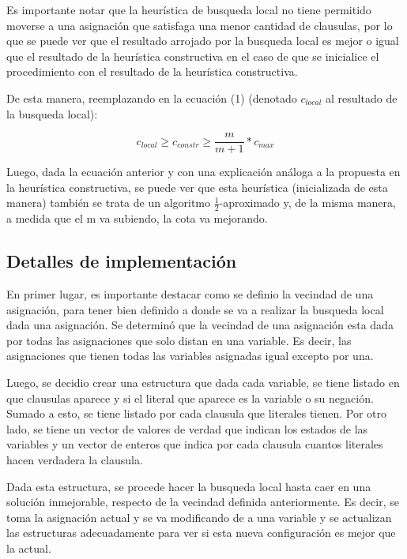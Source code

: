 \documentclass[a4paper,10pt]{article}
\begin{document}
Es importante notar que la heur\'istica de busqueda local no tiene permitido moverse a una asignaci\'on que satisfaga una menor cantidad de clausulas, por lo que se puede ver que el resultado arrojado por la busqueda local es mejor o igual que el resultado de la heur\'istica constructiva en el caso de que se inicialice el procedimiento con el resultado de la heur\'istica constructiva.

De esta manera, reemplazando en la ecuaci\'on (1) (denotado $c_{local}$ al resultado de la busqueda local):

\begin{equation}
c_{local} \geq c_{constr} \geq \frac{m}{m+1}*c_{max}
\end{equation}

Luego, dada la ecuaci\'on anterior y con una explicaci\'on an\'aloga a la propuesta en la heur\'istica constructiva, se puede ver que esta heur\'istica (inicializada de esta manera) tambi\'en se trata de un algoritmo $\frac{1}{2}$-aproximado y, de la misma manera, a medida que el m va subiendo, la cota va mejorando.


\subsection*{Detalles de implementaci\'on}

En primer lugar, es importante destacar como se definio la vecindad de una asignaci\'on, para tener bien definido a donde se va a realizar la busqueda local dada una asignaci\'on. Se determin\'o que la vecindad de una asignaci\'on esta dada por todas las asignaciones que solo distan en una variable. Es decir, las asignaciones que tienen todas las variables asignadas igual excepto por una.

Luego, se decidio crear una estructura que dada cada variable, se tiene listado en que clausulas aparece y si el literal que aparece es la variable o su negaci\'on. Sumado a esto, se tiene listado por cada clausula que literales tienen. Por otro lado, se tiene un vector de valores de verdad que indican los estados de las variables y un vector de enteros que indica por cada clausula cuantos literales hacen verdadera la clausula.

Dada esta estructura, se procede hacer la busqueda local hasta caer en una soluci\'on inmejorable, respecto de la vecindad definida anteriormente. Es decir, se toma la asignaci\'on actual y se va modificando de a una variable y se actualizan las estructuras adecuadamente para ver si esta nueva configuraci\'on es mejor que la actual. 
\end{document}
